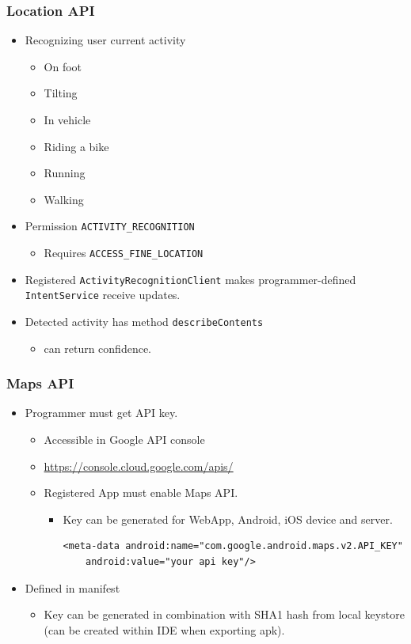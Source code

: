 \documentclass[10pt,xcolor=pdflatex]{beamer}
\begin{document}
\begin{frame}[fragile]\frametitle{Location API}
\begin{itemize}
	\item Recognizing user current activity
	  \begin{itemize}
		\item On foot
		\item Tilting
		\item In vehicle
		\item Riding a bike
		\item Running
		\item Walking
	  \end{itemize}
    \item Permission \texttt{ACTIVITY\_RECOGNITION}
      \begin{itemize}
    	\item Requires \texttt{ACCESS\_FINE\_LOCATION}
      \end{itemize}
    \item Registered \texttt{ActivityRecognitionClient} makes programmer-defined \texttt{IntentService} receive updates.
	\item Detected activity has method \texttt{describeContents}
      \begin{itemize}
    	\item can return confidence.
      \end{itemize}
\end{itemize}
\end{frame}


\begin{frame}[fragile]\frametitle{Maps API}
\begin{itemize}
	\item Programmer must get API key.
      \begin{itemize}
    	\item Accessible in Google API console
    	\item[] \url{https://console.cloud.google.com/apis/}
		\item Registered App must enable Maps API.
          \begin{itemize}
            \item Key can be generated for WebApp, Android, iOS device and server. 
               \lstset{language=XML, basicstyle=\footnotesize\ttfamily}
                    \begin{lstlisting}
<meta-data android:name="com.google.android.maps.v2.API_KEY"
    android:value="your api key"/>
\end{lstlisting}    
          \end{itemize}
      \end{itemize}
    \item Defined in manifest
      \begin{itemize}
   	 	\item Key can be generated in combination with SHA1 hash from local keystore (can be created within IDE when exporting apk).
      \end{itemize}
\end{itemize}
\end{frame}
\end{document}
